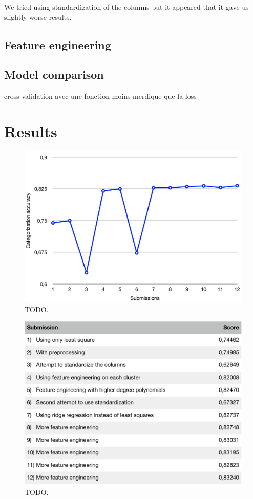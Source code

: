 \documentclass[10pt,conference,compsocconf]{IEEEtran}
\begin{document}
We tried using standardization of the columns but it appeared that it gave us slightly worse results.

\subsection{Feature engineering}
\subsection{Model comparison}
cross validation avec une fonction moins merdique que la loss




\section{Results}

\begin{figure}[h]
  \centering
  \includegraphics[width=\columnwidth]{graph}
  \caption{TODO.}
\end{figure}

\begin{figure}[h]
  \centering
  \includegraphics[width=\columnwidth]{table}
  \caption{TODO.}
\end{figure}
\end{document}
